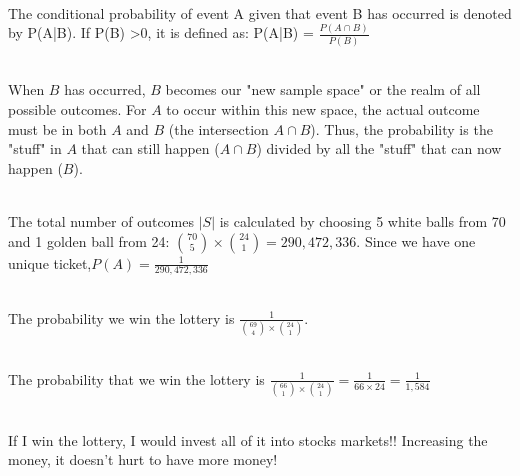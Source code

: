 \documentclass[12pt]{article}
\begin{document}
\begin{enumerate}

\\
The conditional probability of event A given that event B has occurred is denoted by P(A|B). If P(B) >0, it is defined as: 
P(A|B) = $\frac{P(A\cap B)}{P(B)}$

\\
When $B$ has occurred, $B$ becomes our "new sample space" or the realm of all possible outcomes. For $A$ to occur within this new space, the actual outcome must be in both $A$ and $B$ (the intersection $A \cap B$). Thus, the probability is the "stuff" in $A$ that can still happen ($A \cap B$) divided by all the "stuff" that can now happen ($B$).

\\The total number of outcomes $|S|$ is calculated by choosing 5 white balls from 70 and 1 golden ball from 24: $\binom{70}{5} \times \binom{24}{1} = 290,472,336$. Since we have one unique ticket,$P(A) = \frac{1}{290,472,336}$

\\The probability we win the lottery is $\frac{1}{\binom{69}{4} \times \binom{24}{1}}$.

\\The probability that we win the lottery is $\frac{1}{\binom{66}{1} \times \binom{24}{1}} = \frac{1}{66 \times 24} = \frac{1}{1,584}$

\\
If I win the lottery, I would invest all of it into stocks markets!! Increasing the money, it doesn't hurt to have more money!

\end{enumerate}
\end{document}
